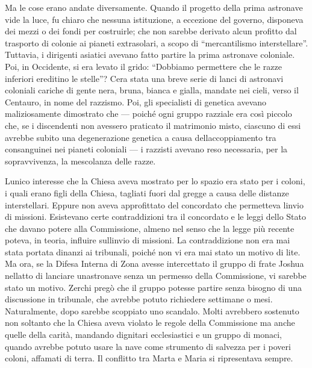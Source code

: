 Ma le cose erano andate diversamente. Quando il progetto della prima
astronave vide la luce, fu chiaro che nessuna istituzione, a eccezione
del governo, disponeva dei mezzi o dei fondi per costruirle; che non
sarebbe derivato alcun profitto dal trasporto di colonie ai pianeti
extrasolari, a scopo di ``mercantilismo interstellare''. Tuttavia, i
dirigenti asiatici avevano fatto partire la prima astronave coloniale.
Poi, in Occidente, si era levato il grido: ``Dobbiamo permettere che le
razze inferiori ereditino le stelle''? C\textquotesingle era stata una
breve serie di lanci di astronavi coloniali cariche di gente nera,
bruna, bianca e gialla, mandate nei cieli, verso il Centauro, in nome
del razzismo. Poi, gli specialisti di genetica avevano maliziosamente
dimostrato che --- poiché ogni gruppo razziale era così piccolo che, se
i discendenti non avessero praticato il matrimonio misto, ciascuno di
essi avrebbe subito una degenerazione genetica a causa
dell\textquotesingle accoppiamento tra consanguinei nei pianeti
coloniali --- i razzisti avevano reso necessaria, per la sopravvivenza,
la mescolanza delle razze.

L\textquotesingle unico interesse che la Chiesa aveva mostrato per lo
spazio era stato per i coloni, i quali erano figli della Chiesa,
tagliati fuori dal gregge a causa delle distanze interstellari. Eppure
non aveva approfittato del concordato che permetteva
l\textquotesingle invio di missioni. Esistevano certe contraddizioni tra
il concordato e le leggi dello Stato che davano potere alla Commissione,
almeno nel senso che la legge più recente poteva, in teoria, influire
sull\textquotesingle invio di missioni. La contraddizione non era mai
stata portata dinanzi ai tribunali, poiché non vi era mai stato un
motivo di lite. Ma ora, se la Difesa Interna di Zona avesse intercettato
il gruppo di frate Joshua nell\textquotesingle atto di lanciare
un\textquotesingle astronave senza un permesso della Commissione, vi
sarebbe stato un motivo. Zerchi pregò che il gruppo potesse partire
senza bisogno di una discussione in tribunale, che avrebbe potuto
richiedere settimane o mesi. Naturalmente, dopo sarebbe scoppiato uno
scandalo. Molti avrebbero sostenuto non soltanto che la Chiesa aveva
violato le regole della Commissione ma anche quelle della carità,
mandando dignitari ecclesiastici e un gruppo di monaci, quando avrebbe
potuto usare la nave come strumento di salvezza per i poveri coloni,
affamati di terra. Il conflitto tra Marta e Maria si ripresentava
sempre.

